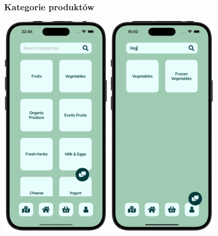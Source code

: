 \subsubsection{Kategorie produktów}
\begin{center} 
    \includegraphics[width=0.4\textwidth]{images/front/categories_page.png} 
    \includegraphics[width=0.4\textwidth]{images/front/categories_filtered.png} 
\end{center}

